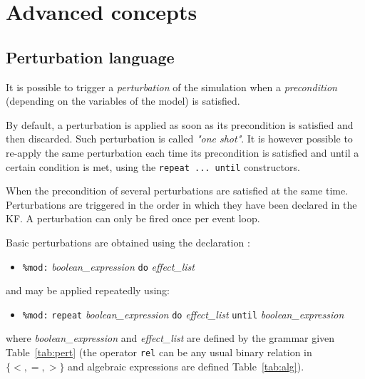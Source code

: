 \documentclass[11pt]{book}
\def\ttt#1{\texttt{#1}}
\def\set#1{\{#1\}}
\def\ITE#1{\begin{itemize}#1\end{itemize}}
\begin{document}
\chapter{Advanced concepts}\label{chap:advanced}

\section{Perturbation language}\label{sec:mod}

It is possible to trigger a \emph{perturbation} of
the simulation when a \textit{precondition} (depending on the
variables of the model) is satisfied.

By default, a perturbation is applied as soon as its precondition is
satisfied and then discarded. Such perturbation is called \emph{"one
  shot"}. It is however possible to
re-apply the same perturbation each time its precondition is
satisfied and until a certain condition is met, using the \ttt{repeat
  ... until} constructors.

When the precondition of several perturbations are satisfied at the
same time. Perturbations are triggered in the order in which they have
been declared in the KF. A perturbation can only be
fired once per event loop.

Basic perturbations are obtained using the declaration :
\ITE{
\item[] \ttt{\%mod:} \textit{boolean\_expression} \ttt{do} \textit{effect\_list}
}
and may be applied repeatedly using:
\ITE{
\item[] \ttt{\%mod:} \ttt{repeat} \textit{boolean\_expression} \ttt{do} \textit{effect\_list} \ttt{until} \textit{boolean\_expression}
}
where \textit{boolean\_expression} and \textit{effect\_list} are defined by the grammar given  Table~\ref{tab:pert} (the operator \ttt{rel} can be any usual binary relation in $\set{<,=,>}$ and algebraic expressions are defined Table~\ref{tab:alg}).
\end{document}
